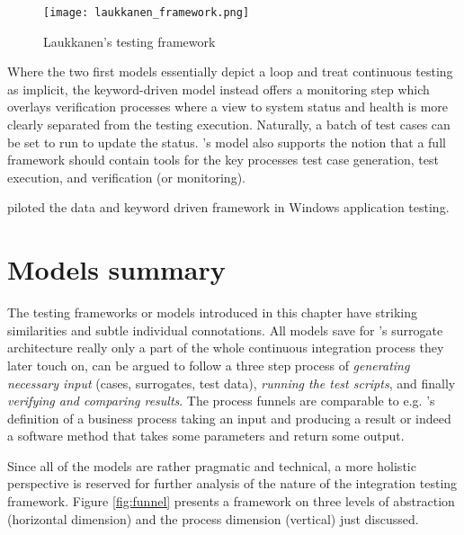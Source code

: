\documentclass[12pt,a4paper,oneside,pdftex]{report}
\begin{document}
\begin{figure}[H]
  \begin{center}
    \texttt{[image: laukkanen\_framework.png]}
    \caption{Laukkanen's testing framework \citep{laukkanen2006data}}
    \label{fig:laukkanen} 
  \end{center}
\end{figure}

Where the two first models essentially depict a loop and treat continuous testing as implicit, the keyword-driven model instead offers a monitoring step which overlays verification processes where a view to system status and health is more clearly separated from the testing execution. Naturally, a batch of test cases can be set to run to update the status. \citeauthor{laukkanen2006data}'s \citeyearpar{laukkanen2006data} model also supports the notion that a full framework should contain tools for the key processes test case generation, test execution, and verification (or monitoring).

\citet{laukkanen2006data} piloted the data and keyword driven framework in Windows application testing.

\section{Models summary}

The testing frameworks or models introduced in this chapter have striking similarities and subtle individual connotations. All models save for \citeauthor{huang2008surrogate}'s \citeyearpar{huang2008surrogate} surrogate architecture really only a part of the whole continuous integration process they later touch on, can be argued to follow a three step process of \emph{generating necessary input} (cases, surrogates, test data), \emph{running the test scripts}, and finally \emph{verifying and comparing results}. The process funnels are comparable to e.g. \citeauthor{davenport1993process}'s \citeyearpar{davenport1993process} definition of a business process taking an input and producing a result or indeed a software method that takes some parameters and return some output.

Since all of the models are rather pragmatic and technical, a more holistic perspective is reserved for further analysis of the nature of the integration testing framework. Figure \ref{fig:funnel} presents a framework on three levels of abstraction (horizontal dimension) and the process dimension (vertical) just discussed.
\end{document}
